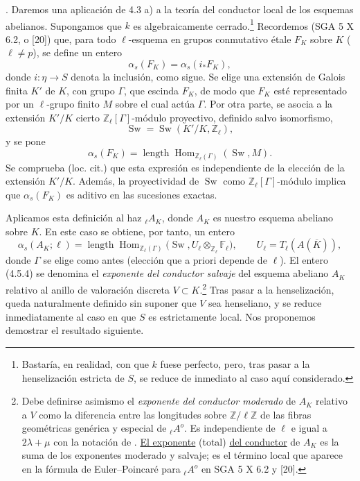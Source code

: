 \par\medskip
{}. Daremos una aplicación de 4.3 a) a la teoría del conductor local
de los esquemas abelianos. Supongamos que $k$ es algebraicamente
cerrado.\footnote{Bastaría, en realidad, con que $k$ fuese perfecto,
pero, tras pasar a la henselización estricta de $S$, se reduce de
inmediato al caso aquí considerado.} Recordemos (SGA 5 X 6.2, o [20])
que, para todo $\ell$-esquema en grupos conmutativo étale $F_K$ sobre
$K$ ($\ell\neq p$), se define un entero
\begin{equation}\tag{4.5.1}
 \alpha_s(F_K)=\alpha_s(i_*F_K),
\end{equation}
donde $i:\eta\longrightarrow S$ denota la inclusión, como sigue. Se
elige una extensión de Galois finita $K'$ de $K$, con grupo $\Gamma$,
que escinda $F_K$, de modo que $F_K$ esté representado por un
$\ell$-grupo finito $M$ sobre el cual actúa $\Gamma$. Por otra parte,
se asocia a la extensión $K'/K$ cierto $\mathbb Z_\ell[\Gamma]$-módulo
proyectivo, definido salvo isomorfismo,
\begin{equation}\tag{4.5.2}
 \operatorname{Sw}=\operatorname{Sw}(K'/K,\mathbb Z_\ell),
\end{equation}
y se pone
\begin{equation}\tag{4.5.3}
 \alpha_s(F_K)
 =\operatorname{length}
   \operatorname{Hom}_{\mathbb Z_\ell(\Gamma)}(\operatorname{Sw},M).
\end{equation}
Se comprueba (loc. cit.) que esta expresión es independiente de la
elección de la extensión $K'/K$. Además, la proyectividad de
$\operatorname{Sw}$ como $\mathbb Z_\ell[\Gamma]$-módulo implica que
$\alpha_s(F_K)$ es aditivo en las sucesiones exactas.

Aplicamos esta definición al haz ${}_\ell A_K$, donde $A_K$ es nuestro
esquema abeliano sobre $K$. En este caso se obtiene, por tanto, un entero
\begin{equation}\tag{4.5.4}
 \alpha_s(A_K;\ell)
 =\operatorname{length}
   \operatorname{Hom}_{\mathbb Z_\ell(\Gamma)}
   \bigl(\operatorname{Sw},
         U_\ell\otimes_{\mathbb Z_\ell}\mathbb F_\ell\bigr),
 \qquad
 U_\ell=T_\ell(A(\overline K)),
\end{equation}
donde $\Gamma$ se elige como antes (elección que a priori depende de
$\ell$). El entero (4.5.4) se denomina el \emph{exponente del conductor
salvaje} del esquema abeliano $A_K$ relativo al anillo de valoración
discreta $V\subset K$.\footnote{Debe definirse asimismo el
\emph{exponente del conductor moderado} de $A_K$ relativo a $V$ como la
diferencia entre las longitudes sobre $\mathbb Z/\ell\mathbb Z$ de las
fibras geométricas genérica y especial de ${}_\ell A^o$. Es
independiente de $\ell$ e igual a $2\lambda+\mu$ con la notación de
. \underline{El exponente} (total) \underline{del conductor} de $A_K$ es la suma de los
exponentes moderado y salvaje; es el término local que aparece en la
fórmula de Euler--Poincaré para ${}_\ell A^o$ en SGA 5 X 6.2 y [20].}
Tras pasar a la henselización, queda naturalmente definido sin suponer
que $V$ sea henseliano, y se reduce inmediatamente al caso en que $S$
es estrictamente local. Nos proponemos demostrar el resultado siguiente.

